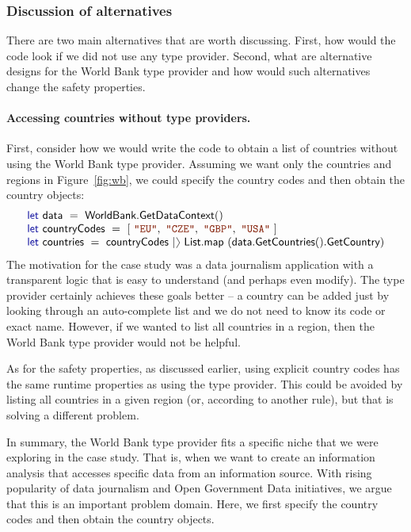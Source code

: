 \documentclass[submission,copyright,creativecommons]{eptcs}
\newcommand{\rangl}{\begin{picture}(4.5,7)
\put(.9,2.5){\rotatebox{120}{\line(1,0){5.5}}}
\put(.9,2.5){\rotatebox{240}{\line(1,0){5.5}}}
\end{picture}}
\newcommand{\kvd}[1]{\textnormal{\textcolor{kvdclr}{\sffamily #1}}}
\newcommand{\str}[1]{\textnormal{\textcolor{strclr}{\ttfamily "#1"}}}
\newcommand{\ident}[1]{\textnormal{\sffamily #1}}
\begin{document}
\subsubsection{Discussion of alternatives}

There are two main alternatives that are worth discussing. First, how would the code look if
we did not use any type provider. Second, what are alternative designs for the World Bank type
provider and how would such alternatives change the safety properties.

\vspace{-1em}
\paragraph{Accessing countries without type providers.} First, consider how we would write the code to obtain a list
of countries without using the World Bank type provider. Assuming we want only the countries and
regions in Figure~\ref{fig:wb}, we could specify the country codes and then obtain the country objects:
%
\begin{equation*}
\begin{array}{l}
 \kvd{let}~\ident{data}~=~\ident{WorldBank.GetDataContext}() \\
 \kvd{let}~\ident{countryCodes}~=~\lbrack~\str{EU},~\str{CZE},~\str{GBP},~\str{USA}~\rbrack \\
 \kvd{let}~\ident{countries}~=~\ident{countryCodes}~|\rangl~\ident{List.map}~(\ident{data.GetCountries}().\ident{GetCountry})
\end{array}
\end{equation*}
%
The motivation for the case study was a data journalism application with a transparent logic
that is easy to understand (and perhaps even modify). The type provider certainly achieves these
goals better -- a country can be added just by looking through an auto-complete list and we do not
need to know its code or exact name. However, if we wanted to list all countries in a region, then
the World Bank type provider would not be helpful.

As for the safety properties, as discussed earlier, using explicit country codes has the same
runtime properties as using the type provider. This could be avoided by listing all countries in
a given region (or, according to another rule), but that is solving a different problem.

In summary, the World Bank type provider fits a specific niche that we were exploring in the case
study. That is, when we want to create an information analysis that accesses specific data from
an information source. With rising popularity of data journalism and Open Government Data
initiatives, we argue that this is an important problem domain. Here, we first specify the country
codes and then obtain the country objects.
\end{document}
